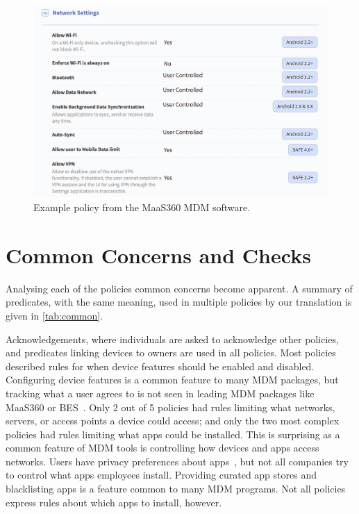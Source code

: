 \documentclass[conference,twocolumn]{IEEEtran}
\begin{document}
\begin{figure}
  \includegraphics[width=\linewidth]{maas360-policy.png}
  \caption{Example policy from the MaaS360 MDM software.}
  \label{fig:policy}
\end{figure}

\section{Common Concerns and Checks}
\label{sec:common_concerns}

Analysing each of the policies common concerns become apparent.
A summary of predicates, with the same meaning, used in multiple policies by our translation is given in \autoref{tab:common}.


Acknowledgements, where individuals are asked to acknowledge other policies, and predicates linking devices to owners are used in all policies.
Most policies described rules for when device features should be enabled and disabled.
Configuring device features is a common feature to many MDM packages, but tracking what a user agrees to is not seen in leading MDM packages like MaaS360 or BES~\cite{rob_smith_magic_2016}.
Only 2 out of 5 policies had rules limiting what networks, servers, or access points a device could access;
  and only the two most complex policies had rules limiting what apps could be installed.
This is surprising as a common feature of MDM tools is controlling how devices and apps access networks.
Users have privacy preferences about apps~\cite{lin_modeling_2014}, but not all companies try to control what apps employees install.
Providing curated app stores and blacklisting apps is a feature common to many MDM programs.
Not all policies express rules about which apps to install, however.
\end{document}
